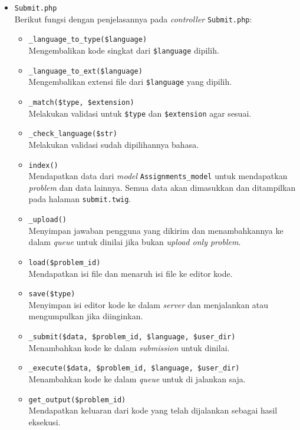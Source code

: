 \begin{itemize}
      \item \verb|Submit.php| \\
            Berikut fungsi dengan penjelasannya pada \textit{controller} \verb|Submit.php|:

            \begin{itemize}
                  \item \verb|_language_to_type($language)| \\
                        Mengembalikan kode singkat dari \verb|$language| dipilih.
                  \item \verb|_language_to_ext($language)| \\
                        Mengembalikan extensi file dari \verb|$language| yang dipilih.
                  \item \verb|_match($type, $extension)| \\
                        Melakukan validasi untuk \verb|$type| dan \verb|$extension| agar sesuai.
                  \item \verb|_check_language($str)| \\
                        Melakukan validasi sudah dipilihannya bahasa.
                  \item \verb|index()| \\
                        Mendapatkan data dari \textit{model} \verb|Assignments_model| untuk mendapatkan \textit{problem} dan data lainnya. Semua data akan dimasukkan dan ditampilkan pada halaman \verb|submit.twig|.
                  \item \verb|_upload()| \\
                        Menyimpan jawaban pengguna yang dikirim dan menambahkannya ke dalam \textit{queue} untuk dinilai jika bukan \textit{upload only problem}.
                  \item \verb|load($problem_id)| \\
                        Mendapatkan isi file dan menaruh isi file ke editor kode.
                  \item \verb|save($type)| \\
                        Menyimpan isi editor kode ke dalam \textit{server} dan menjalankan atau mengumpulkan jika diinginkan.
                  \item \verb|_submit($data, $problem_id, $language, $user_dir)| \\
                        Menambahkan kode ke dalam \textit{submission} untuk dinilai.
                  \item \verb|_execute($data, $problem_id, $language, $user_dir)| \\
                        Menambahkan kode ke dalam \textit{queue} untuk di jalankan saja.
                  \item \verb|get_output($problem_id)| \\
                        Mendapatkan keluaran dari kode yang telah dijalankan sebagai hasil eksekusi.
            \end{itemize}


\end{itemize}
